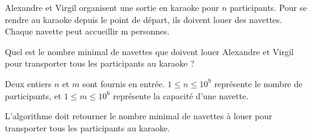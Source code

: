 \problemname{\problemyamlname}


Alexandre et Virgil organisent une sortie en karaoke pour $n$ participants.
Pour se rendre au karaoke depuis le point de départ, ils doivent louer des navettes. Chaque navette peut accueillir m personnes.

Quel est le nombre minimal de navettes que doivent louer Alexandre et Virgil pour transporter tous les participants au karaoke ?

\begin{Input}
	Deux entiers $n$ et $m$ sont fournis en entrée. $1 \le n \le 10^9$ représente le nombre de participants, et $1 \le m \le 10^6$ représente la capacité d'une navette.
\end{Input}

\begin{Output}
	L'algorithme doit retourner le nombre minimal de navettes à louer pour transporter tous les participants au karaoke.
\end{Output}
